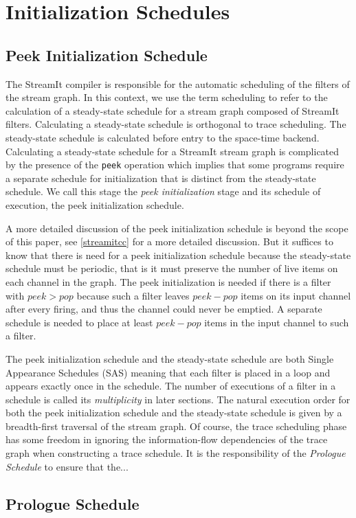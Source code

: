 \section{Initialization Schedules}
\subsection{Peek Initialization Schedule}
The StreamIt compiler is responsible for the automatic scheduling of
the filters of the stream graph. In this context, we use the term
scheduling to refer to the calculation of a steady-state schedule for
a stream graph composed of StreamIt filters.  Calculating a
steady-state schedule is orthogonal to trace scheduling. The
steady-state schedule is calculated before entry to the space-time
backend.  Calculating a steady-state schedule for a StreamIt stream
graph is complicated by the presence of the {\tt peek} operation which
implies that some programs require a separate schedule for
initialization that is distinct from the steady-state schedule.  We
call this stage the {\it peek initialization} stage and its schedule
of execution, the {peek initialization schedule}.

A more detailed discussion of the peek initialization schedule is
beyond the scope of this paper, see \ref{streamitcc} for a more
detailed discussion.  But it suffices to know that there is
need for a peek initialization schedule because the steady-state schedule
must be periodic, that is it must preserve the number of live items on
each channel in the graph.  The peek initialization is needed if there
is a filter with $peek > pop$ because such a filter leaves $peek -
pop$ items on its input channel after every firing, and thus the
channel could never be emptied.  A separate schedule is needed to
place at least $peek - pop$ items in the input channel to such a filter.

The peek initialization schedule and the steady-state schedule are
both Single Appearance Schedules (SAS) meaning that each filter is
placed in a loop and appears exactly once in the schedule.  The number
of executions of a filter in a schedule is called its {\it
multiplicity} in later sections.  The natural execution order for both
the peek initialization schedule and the steady-state schedule is
given by a breadth-first traversal of the stream graph. Of course, the
trace scheduling phase has some freedom in ignoring the
information-flow dependencies of the trace graph when constructing a
trace schedule.  It is the responsibility of the {\it Prologue
Schedule} to ensure that the...

\subsection{Prologue Schedule}
\label{sec:prologue}